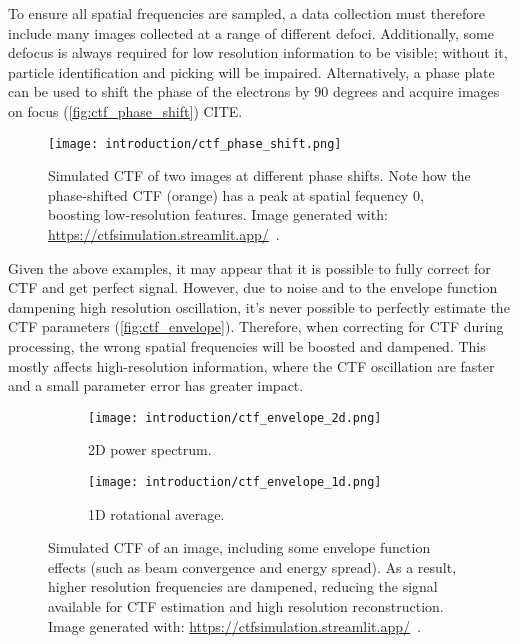 To ensure all spatial frequencies are sampled, a data collection must therefore include many images collected at a range of different defoci. Additionally, some defocus is always required for low resolution information to be visible; without it, particle identification and picking will be impaired. Alternatively, a phase plate can be used to shift the phase of the electrons by 90 degrees and acquire images on focus (\autoref{fig:ctf_phase_shift}) CITE.

\begin{figure}[ht]
    \centering
    \texttt{[image: introduction/ctf\_phase\_shift.png]}
    \caption[CTF: effect of phase shift]{Simulated CTF of two images at different phase shifts. Note how the phase-shifted CTF (orange) has a peak at spatial fequency \num{0}, boosting low-resolution features. Image generated with: \url{https://ctfsimulation.streamlit.app/}~\cite{jiangWebbasedSimulationContrast2001}.}
    \label{fig:ctf_phase_shift}
\end{figure}

Given the above examples, it may appear that it is possible to fully correct for CTF and get perfect signal. However, due to noise and to the envelope function dampening high resolution oscillation, it's never possible to perfectly estimate the CTF parameters (\autoref{fig:ctf_envelope}). Therefore, when correcting for CTF during processing, the wrong spatial frequencies will be boosted and dampened. This mostly affects high-resolution information, where the CTF oscillation are faster and a small parameter error has greater impact.

\begin{figure}[ht]
    \centering
    \begin{subfigure}[B]{.42\textwidth}
        \centering
        \texttt{[image: introduction/ctf\_envelope\_2d.png]}
        \caption{2D power spectrum.}
        \label{fig:ctf_envelope_2d}
    \end{subfigure}%
    \hfill
    \begin{subfigure}[B]{.55\textwidth}
        \centering
        \texttt{[image: introduction/ctf\_envelope\_1d.png]}
        \caption{1D rotational average.}
        \label{fig:ctf_envelope_1d}
    \end{subfigure}%
    \caption[CTF: effect of the envelope function]{Simulated CTF of an image, including some envelope function effects (such as beam convergence and energy spread). As a result, higher resolution frequencies are dampened, reducing the signal available for CTF estimation and high resolution reconstruction. Image generated with: \url{https://ctfsimulation.streamlit.app/}~\cite{jiangWebbasedSimulationContrast2001}.}
    \label{fig:ctf_envelope}
\end{figure}

